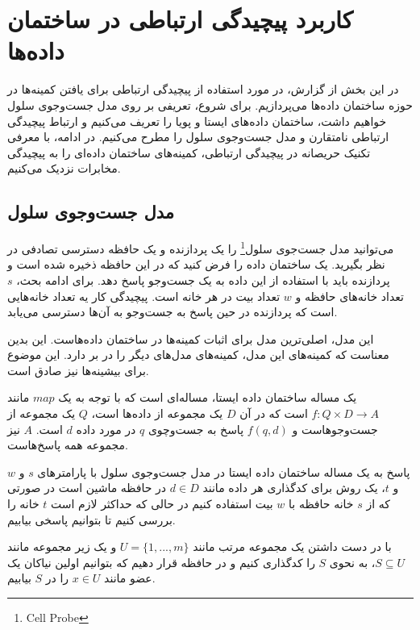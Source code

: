 \chapter{کاربرد پیچیدگی ارتباطی در ساختمان داده‌ها }\label{chapter4}
در این بخش از گزارش، در مورد استفاده از پیچیدگی ارتباطی برای یافتن کمینه‌ها در حوزه ساختمان‌ داده‌ها می‌پردازیم. برای شروع، تعریفی بر روی مدل جست‌وجوی سلول خواهیم داشت، ساختمان‌ داده‌های ایستا و پویا را تعریف می‌کنیم و ارتباط پیچیدگی ارتباطی نامتقارن و مدل جست‌وجوی سلول را مطرح می‌کنیم. در ادامه، با معرفی تکنیک‌ حریصانه در پیچیدگی ارتباطی، کمینه‌های ساختمان داده‌ای را به پیچیدگی مخابرات نزدیک می‌کنیم. 


\section{مدل جست‌وجوی سلول}
می‌توانید مدل جست‌جوی سلول\footnote{Cell Probe} را یک پردازنده و یک حافظه دسترسی تصادفی در نظر بگیرید. یک ساختمان داده را فرض کنید که در این حافظه ذخیره شده است و پردازنده باید با استفاده از این داده به یک جست‌وجو پاسخ دهد. برای ادامه بحث، $s$ تعداد خانه‌های حافظه و $w$ تعداد بیت‌ در هر خانه است. پیچیدگی کار یه تعداد خانه‌هایی است که پردازنده در حین پاسخ به جست‌وجو به آن‌ها دسترسی می‌یابد.\cite{ajtai88} 

این مدل، اصلی‌ترین مدل برای اثبات کمینه‌ها در ساختمان داده‌هاست. این بدین معناست که کمینه‌های این مدل، کمینه‌های مدل‌های دیگر را در بر دارد. این موضوع برای بیشینه‌ها نیز صادق است. 

\begin{definition}
یک مساله ساختمان داده ایستا، مساله‌ای است که با توجه به یک $map$ مانند $f:Q\times D \rightarrow A$ است که در آن $D$ یک مجموعه از داده‌ها است، $Q$ یک مجموعه از جست‌وجوهاست و $f(q,d)$ پاسخ به جست‌وچوی $q$ در مورد داده ‏$d$ است. $A$ نیز مجموعه همه پاسخ‌هاست. 
\end{definition}

\begin{definition}
پاسخ به یک مساله ساختمان داده ایستا در مدل جست‌وجوی سلول با پارامترهای $s$ و $w$ و $t$، یک روش برای کدگذاری هر داده مانند $d \in D$ در حافظه ماشین است در صورتی که از $s$ خانه حافظه با $w$ بیت استفاده کنیم در حالی که حداکثر لازم است $t$ خانه را بررسی کنیم تا بتوانیم پاسخی بیابیم. 
\end{definition}

\begin{example}
با در دست داشتن یک مجموعه مرتب مانند $U = \{ 1,...,m\}$ و یک زیر مجموعه مانند $S \subseteq U$، به نحوی $S$ را کدگذاری کنیم و در حافظه قرار دهیم که بتوانیم اولین نیاکان یک عضو مانند $x \in U$ را در $S$ بیابیم. 
\end{example}
 
